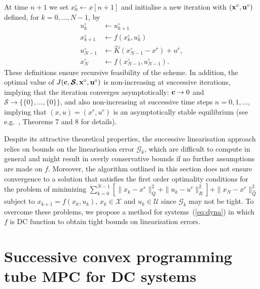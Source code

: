 \documentclass[a4paper, 10 pt, conference]{IEEEconf}
\def\G{\mathcal{G}}
\def\U{\mathcal{U}}
\def\X{\mathcal{X}}
\def\bc{{\bf c}}
\def\bS{\boldsymbol{\mathcal{S}}}
\begin{document}
At time $n+1$ we set $x^\circ_0 \gets  x[n+1]$ and initialise a new iteration with $({\bf x}^\circ,{\bf u}^\circ)$ defined, for $k=0,\ldots,N-1$, by
\begin{subequations}\label{eq:step_update3}
\begin{align}
u^\circ_{k} &\gets u^\circ_{k+1}
\\
\label{eq:step_update4}
x^\circ_{k+1} &\gets  f(x^\circ_{k}, u^\circ_{k})
\\
\label{eq:step_update5_}
 u^\circ_{N-1} &\gets \hat{K}(x^\circ_{N-1} - x^r) + u^r,
\\
\label{eq:step_update5}
x^\circ_{N} &\gets  f(x^\circ_{N-1}, u^\circ_{N-1}).
\end{align}
\end{subequations}
These definitions ensure recursive feasibility of the scheme. In addition, the optimal value of $J(\bc,\bS,{\bf x}^\circ,{\bf u}^\circ)$ is non-increasing at successive iterations, implying that the iteration converges asymptotically: $\bc \to 0$ and $\bS\to\{\{0\},\ldots,\{0\}\}$, and also non-increasing at successive time steps $n=0,1,\ldots$, implying that $(x,u)= (x^r,u^r)$ is an asymptotically stable equilibrium (see e.g.~\cite{mark}, Theorems 7 and 8 for details).


Despite its attractive theoretical properties, the successive linearisation approach relies on bounds on the linearisation error $\G_k$, which are difficult to compute in general and might result in overly conservative bounds if no further assumptions are made on $f$. Moreover, the algorithm outlined in this section does not ensure convergence to a solution that satisfies the first order optimality conditions for the problem of minimizing $\sum_{k=0}^{N-1} [\|x_k-x^r\|_Q^2 + \|u_k-u^r\|_R^2] + \|x_N-x^r\|_{\hat{Q}}^2$ subject to $x_{k+1}=f(x_k,u_k)$, $x_k\in\X$ and $u_k\in\U$ since $\G_k$ may not be tight.
To overcome these problems, we propose a method for systems~(\ref{eq:dyna}) in which $f$ is DC function to obtain tight bounds on linearisation errors.


\section{Successive convex programming tube MPC for DC systems}
\label{sec:theory}
\end{document}
